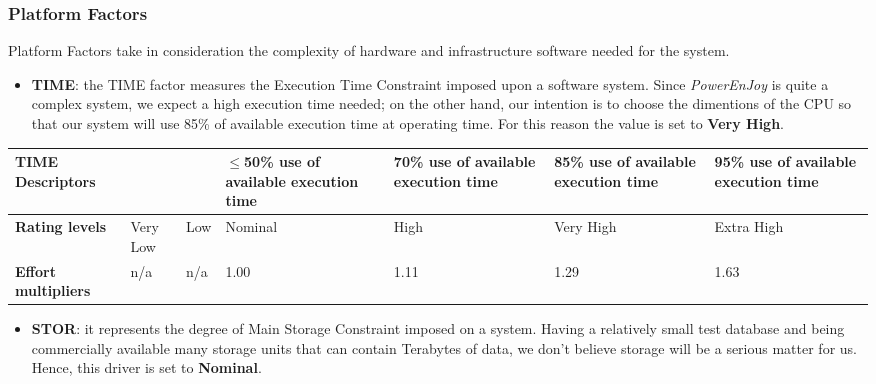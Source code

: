 	
	
	\subsubsection*{Platform Factors}
	Platform Factors take in consideration the complexity of hardware and infrastructure software needed for the system. 
	
	
		\begin{itemize}
			\item \textbf{TIME}: the TIME factor measures the Execution Time Constraint imposed upon a software system. Since \textit{PowerEnJoy} is quite a complex system, we expect a high execution time needed; on the other hand, our intention is to choose the dimentions of the CPU so that our system will use 85\% of available execution time at operating time. For this reason the value is set to \textbf{Very High}.
		\end{itemize}
		
		\begin{center}
			\begin{tabular}{ | C{2cm} | C{2cm} | C{2cm} | C{2cm} | C{2cm} | C{2cm} | C{2cm} | }
				\hline
				\textbf{TIME Descriptors} & & & $\leq$50\% use of available execution time & 70\% use of available execution time & 85\% use of available execution time & 95\% use of available execution time\\ \hline
			
				\textbf{Rating levels} & Very Low & Low & Nominal & High & Very High & Extra High\\ \hline
			
				\textbf{Effort multipliers} & n/a & n/a & 1.00 & 1.11 & 1.29 & 1.63\\ \hline
			\end{tabular}
		\end{center}
		
		
		
		
		\begin{itemize}
			\item \textbf{STOR}: it represents the degree of Main Storage Constraint imposed on a system. Having a relatively small test database and being commercially available many storage units that can contain Terabytes of data, we don't believe storage will be a serious matter for us. Hence, this driver is set to \textbf{Nominal}.
		\end{itemize}
		
